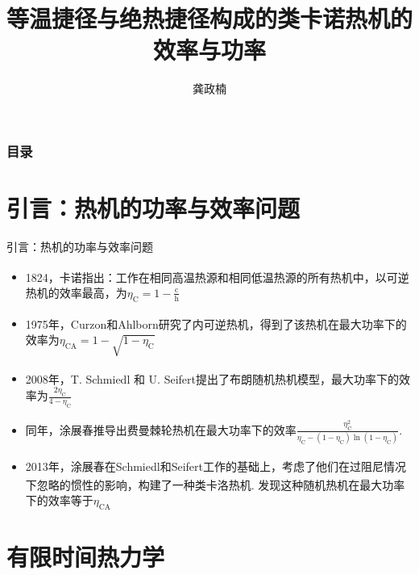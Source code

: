 \documentclass{beamer}
\title{等温捷径与绝热捷径构成的类卡诺热机的效率与功率}
\author{龚政楠}
\institute{北京师范大学}
\newcommand{\upcite}[1]{\textsuperscript{\cite{#1}}}  %
\begin{document}
\begin{frame} %
\titlepage
\end{frame}

\begin{frame}           %
        \addtocounter{framenumber}{-2}%
        \frametitle{目录}
        \tableofcontents 
\end{frame}

\section{引言：热机的功率与效率问题}


\begin{frame}{引言：热机的功率与效率问题}
    \begin{itemize}
        \item<2-> 1824，卡诺指出\upcite{2005}：工作在相同高温热源和相同低温热源的所有热机中，以可逆热机的效率最高，为$\eta _{\mathrm{C}}=1-\frac{\mathrm{c}}{\mathrm{h}}$ 
        \item<3-> 1975年，Curzon和Ahlborn研究了内可逆热机\upcite{Curzon1975}，得到了该热机在最大功率下的效率为$\eta _{\mathrm{CA}}=1-\sqrt{1-\eta _{\mathrm{C}}}$
        \item<4-> 2008年，T. Schmiedl 和 U. Seifert提出了布朗随机热机模型\upcite{Schmiedl2008}，最大功率下的效率为$\frac{2 \eta_{\mathrm{C}}}{4-\eta_{\mathrm{C}}}$
        \item<5-> 同年，涂展春推导出费曼棘轮热机\upcite{Tu2008}在最大功率下的效率$\frac{\eta _{\mathrm{C}}^{2}}{\eta _{\mathrm{C}}-\left( 1-\eta _{\mathrm{C}} \right) \ln \left( 1-\eta _{\mathrm{C}} \right)}$. \upcite{Tu2020}
        \item<6-> 2013年，涂展春在Schmiedl和Seifert工作\upcite{Schmiedl2008}的基础上，考虑了他们在过阻尼情况下忽略的惯性的影响，构建了一种类卡洛热机\upcite{Tu2013}. 发现这种随机热机在最大功率下的效率等于$\eta _{\mathrm{CA}}$
    \end{itemize}    
\end{frame}

\section{有限时间热力学}
\end{document}

